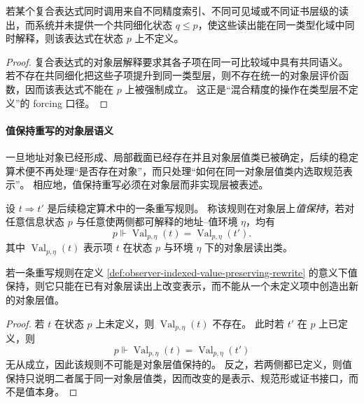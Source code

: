 \begin{corollary}\label{cor:observer-indexed-explicit-lifting}
若某个复合表达式同时调用来自不同精度索引、不同可见域或不同证书层级的读出，而系统并未提供一个共同细化状态 \(q\le p\)，使这些读出能在同一类型化域中同时解释，则该表达式在状态 \(p\) 上不定义。
\end{corollary}

\begin{proof}
复合表达式的对象层解释要求其各子项在同一可比较域中具有共同语义。
若不存在共同细化把这些子项提升到同一类型层，则不存在统一的对象层评价函数，因而该表达式不能在 \(p\) 上被强制成立。
这正是“混合精度的操作在类型层不定义”的 forcing 口径。
\end{proof}

\paragraph{值保持重写的对象层语义}
一旦地址对象已经形成、局部截面已经存在并且对象层值类已被确定，后续的稳定算术便不再处理“是否存在对象”，而只处理“如何在同一对象层值类内选取规范表示”。
相应地，值保持重写必须在对象层而非实现层被表述。

\begin{definition}[值保持重写的对象层语义]\label{def:observer-indexed-value-preserving-rewrite}
设 \(t\Rightarrow t'\) 是后续稳定算术中的一条重写规则。
称该规则在对象层上\emph{值保持}，若对任意信息状态 \(p\) 与任意使两侧都可解释的地址--值环境 \(\eta\)，均有
\[
p\Vdash \operatorname{Val}_{p,\eta}(t)=\operatorname{Val}_{p,\eta}(t').
\]
其中 \(\operatorname{Val}_{p,\eta}(t)\) 表示项 \(t\) 在状态 \(p\) 与环境 \(\eta\) 下的对象层读出类。
\end{definition}

\begin{proposition}[值保持重写不创造对象层值]\label{prop:observer-indexed-value-preserving-no-creation}
若一条重写规则在定义 \ref{def:observer-indexed-value-preserving-rewrite} 的意义下值保持，则它只能在已有对象层读出上改变表示，而不能从一个未定义项中创造出新的对象层值。
\end{proposition}

\begin{proof}
若 \(t\) 在状态 \(p\) 上未定义，则 \(\operatorname{Val}_{p,\eta}(t)\) 不存在。
此时若 \(t'\) 在 \(p\) 上已定义，则
\[
p\Vdash \operatorname{Val}_{p,\eta}(t)=\operatorname{Val}_{p,\eta}(t')
\]
无从成立，因此该规则不可能是对象层值保持的。
反之，若两侧都已定义，则值保持只说明二者属于同一对象层值类，因而改变的是表示、规范形或证书接口，而不是值本身。
\end{proof}

